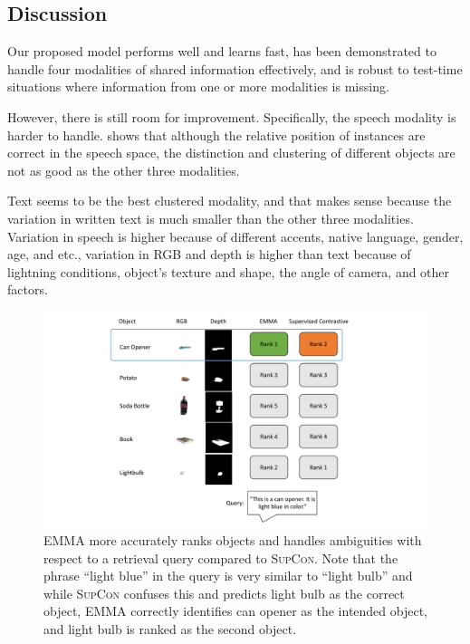 \documentclass[10pt]{article} %
\newcommand{\ours}{\textsc{EMMA}}
\newcommand{\supcon}{\textsc{SupCon}}
\begin{document}
\subsection{Discussion}
Our proposed model performs well and learns fast, has been demonstrated to handle four modalities of shared information effectively, and is robust to test-time situations where information from one or more modalities is missing. 

However, there is still room for improvement. Specifically, the speech modality is harder to handle.  shows that although the relative position of instances are correct in the speech space, the distinction and clustering of different objects are not as good as the other three modalities.

Text seems to be the best clustered modality, and that makes sense because the variation in written text is much smaller than the other three modalities. Variation in speech is higher because of different accents, native language, gender, age, and etc., variation in RGB and depth is higher than text because of lightning conditions, object's texture and shape, the angle of camera, and other factors.

\begin{figure}[h!]
\centering
\includegraphics[width=1\columnwidth]{Figures/example-rankings.pdf}
\caption{\ours{} more accurately ranks objects and handles ambiguities with respect to a retrieval query compared to \supcon{}. Note that the phrase ``light blue'' in the query is very similar to ``light bulb'' and while \supcon{} confuses this and predicts light bulb as the correct object, \ours{} correctly identifies can opener as the intended object, and light bulb is ranked as the second object.
}
\label{fig:rankings}
\end{figure}
\end{document}
